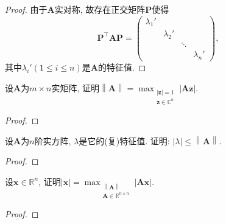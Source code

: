 \begin{quiza}
\begin{proof}
由于\(\boldsymbol{A}\)实对称, 故存在正交矩阵\(\boldsymbol{P}\)使得\[\boldsymbol{P}^\top\boldsymbol{AP}=\left(\begin{matrix}
\lambda_1'&&&\\
&\lambda_2'&&\\
&&\ddots&\\
&&&\lambda_n'
\end{matrix}\right),\]其中\(\lambda_i'(1\leqslant i\leqslant n)\)是\(\boldsymbol{A}\)的特征值.
\end{proof}
\woe 设\(\boldsymbol{A}\)为\(m\times n\)实矩阵, 证明\(\left\|\boldsymbol{A}\right\|=\max_{\substack{|\boldsymbol{z}|=1\\ \boldsymbol{z}\in\mathbb{C}^{n}}}|\boldsymbol{Az}|\).
\begin{proof}

\end{proof}
\woe 设\(\boldsymbol{A}\)为\(n\)阶实方阵, \(\lambda\)是它的(复)特征值. 证明: \(|\lambda|\leqslant\left\|\boldsymbol{A}\right\|\).
\begin{proof}

\end{proof}
\woe 设\(\boldsymbol{x}\in\mathbb{R}^n\), 证明\(|\boldsymbol{x}|=\max_{\substack{\left\|\boldsymbol{A}\right\|\\\boldsymbol{A}\in\mathbb{R}^{n\times n}}}|\boldsymbol{Ax}|.\)
\begin{proof}


\end{proof}
\end{quiza}
